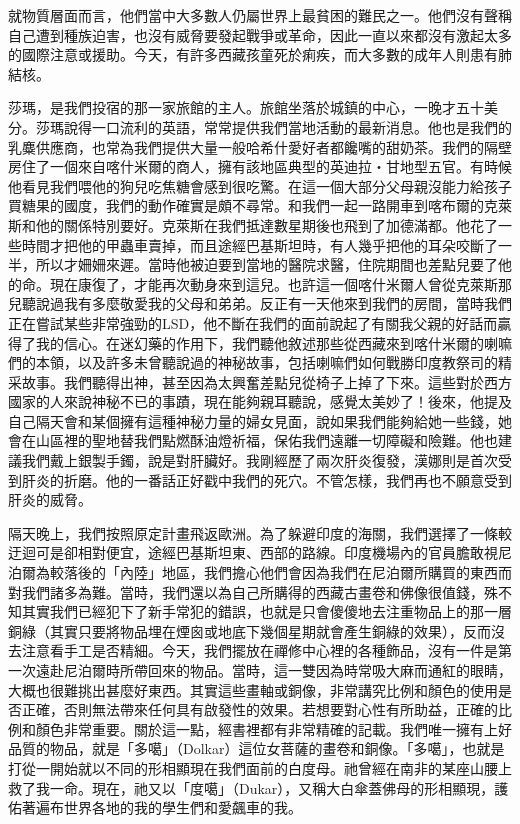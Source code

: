 就物質層面而言，他們當中大多數人仍屬世界上最貧困的難民之一。他們沒有聲稱自己遭到種族迫害，也沒有威脅要發起戰爭或革命，因此一直以來都沒有激起太多的國際注意或援助。今天，有許多西藏孩童死於痢疾，而大多數的成年人則患有肺結核。

莎瑪，是我們投宿的那一家旅館的主人。旅館坐落於城鎮的中心，一晚才五十美分。莎瑪說得一口流利的英語，常常提供我們當地活動的最新消息。他也是我們的乳麋供應商，也常為我們提供大量一般哈希什愛好者都饞嘴的甜奶茶。我們的隔壁房住了一個來自喀什米爾的商人，擁有該地區典型的英迪拉‧甘地型五官。有時候他看見我們喂他的狗兒吃焦糖會感到很吃驚。在這一個大部分父母親沒能力給孩子買糖果的國度，我們的動作確實是頗不尋常。和我們一起一路開車到喀布爾的克萊斯和他的關係特別要好。克萊斯在我們抵達數星期後也飛到了加德滿都。他花了一些時間才把他的甲蟲車賣掉，而且途經巴基斯坦時，有人幾乎把他的耳朵咬斷了一半，所以才姍姍來遲。當時他被迫要到當地的醫院求醫，住院期間也差點兒要了他的命。現在康復了，才能再次動身來到這兒。也許這一個喀什米爾人曾從克萊斯那兒聽說過我有多麼敬愛我的父母和弟弟。反正有一天他來到我們的房間，當時我們正在嘗試某些非常強勁的LSD，他不斷在我們的面前說起了有關我父親的好話而贏得了我的信心。在迷幻藥的作用下，我們聽他敘述那些從西藏來到喀什米爾的喇嘛們的本領，以及許多未曾聽說過的神秘故事，包括喇嘛們如何戰勝印度教祭司的精采故事。我們聽得出神，甚至因為太興奮差點兒從椅子上掉了下來。這些對於西方國家的人來說神秘不已的事蹟，現在能夠親耳聽說，感覺太美妙了！後來，他提及自己隔天會和某個擁有這種神秘力量的婦女見面，說如果我們能夠給她一些錢，她會在山區裡的聖地替我們點燃酥油燈祈福，保佑我們遠離一切障礙和險難。他也建議我們戴上銀製手鐲，說是對肝臟好。我剛經歷了兩次肝炎復發，漢娜則是首次受到肝炎的折磨。他的一番話正好戳中我們的死穴。不管怎樣，我們再也不願意受到肝炎的威脅。

隔天晚上，我們按照原定計畫飛返歐洲。為了躲避印度的海關，我們選擇了一條較迂迴可是卻相對便宜，途經巴基斯坦東、西部的路線。印度機場內的官員膽敢視尼泊爾為較落後的「內陸」地區，我們擔心他們會因為我們在尼泊爾所購買的東西而對我們諸多為難。當時，我們還以為自己所購得的西藏古畫卷和佛像很值錢，殊不知其實我們已經犯下了新手常犯的錯誤，也就是只會傻傻地去注重物品上的那一層銅綠（其實只要將物品埋在煙囪或地底下幾個星期就會產生銅綠的效果），反而沒去注意看手工是否精細。今天，我們擺放在禪修中心裡的各種飾品，沒有一件是第一次遠赴尼泊爾時所帶回來的物品。當時，這一雙因為時常吸大麻而通紅的眼睛，大概也很難挑出甚麼好東西。其實這些畫軸或銅像，非常講究比例和顏色的使用是否正確，否則無法帶來任何具有啟發性的效果。若想要對心性有所助益，正確的比例和顏色非常重要。關於這一點，經書裡都有非常精確的記載。我們唯一擁有上好品質的物品，就是「多噶」（Dolkar）這位女菩薩的畫卷和銅像。「多噶」，也就是打從一開始就以不同的形相顯現在我們面前的白度母。祂曾經在南非的某座山腰上救了我一命。現在，祂又以「度噶」（Dukar），又稱大白傘蓋佛母的形相顯現，護佑著遍布世界各地的我的學生們和愛飆車的我。


